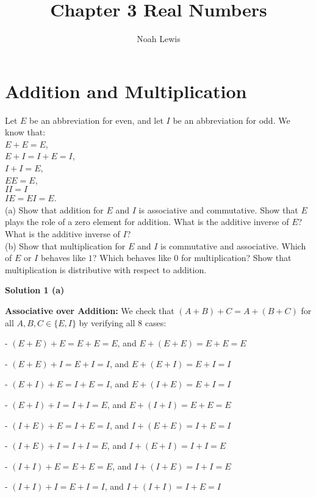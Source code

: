 \documentclass[6pt]{article}
\title{Chapter 3 Real Numbers}
\author{Noah Lewis}
\begin{document}
\maketitle

\section{Addition and Multiplication}

\begin{tcolorbox}[title=Problem 1, breakable]
    Let $E$ be an abbreviation for even, and let $I$ be an abbreviation for odd.
    We know that: \\
    $E + E = E$, \\
    $E + I = I + E = I$, \\
    $I + I = E$, \\
    $EE = E$, \\
    $II = I$ \\
    $IE = EI = E$. \\
    (a) Show that addition for $E$ and $I$ is associative and commutative.
    Show that $E$ plays the role of a zero element for addition. What is
    the additive inverse of $E$? What is the additive inverse of $I$? \\
    (b) Show that multiplication for $E$ and $I$ is commutative and associative.
    Which of $E$ or $I$ behaves like $1$? Which behaves like $0$ for multiplication? 
    Show that multiplication is distributive with respect to addition.
\end{tcolorbox}

\textbf{Solution 1 (a)}

\textbf{Associative over Addition:} We check that $(A + B) + C = A + (B + C)$ 
    for all $A, B, C \in \{E, I\}$ by verifying all 8 cases:

- $(E + E) + E = E + E = E$, and $E + (E + E) = E + E = E$

- $(E + E) + I = E + I = I$, and $E + (E + I) = E + I = I$

- $(E + I) + E = I + E = I$, and $E + (I + E) = E + I = I$

- $(E + I) + I = I + I = E$, and $E + (I + I) = E + E = E$

- $(I + E) + E = I + E = I$, and $I + (E + E) = I + E = I$

- $(I + E) + I = I + I = E$, and $I + (E + I) = I + I = E$

- $(I + I) + E = E + E = E$, and $I + (I + E) = I + I = E$

- $(I + I) + I = E + I = I$, and $I + (I + I) = I + E = I$
\end{document}
